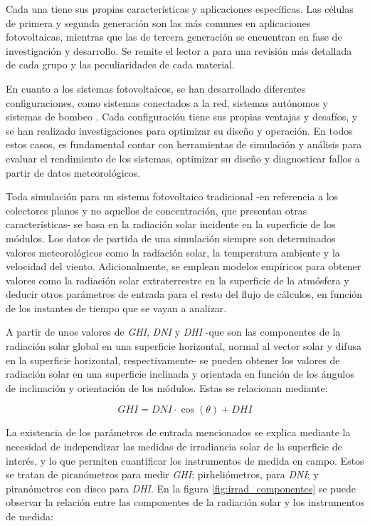 Cada una tiene sus propias características y aplicaciones específicas. Las células de primera y segunda generación son las más comunes en aplicaciones fotovoltaicas, mientras que las de tercera generación se encuentran en fase de investigación y desarrollo. Se remite el lector a \cite{Shubbak_2019} para una revisión más detallada de cada grupo y las peculiaridades de cada material.

En cuanto a los sistemas fotovoltaicos, se han desarrollado diferentes configuraciones, como sistemas conectados a la red, sistemas autónomos y sistemas de bombeo \cite{Perpinan2020}. Cada configuración tiene sus propias ventajas y desafíos, y se han realizado investigaciones para optimizar su diseño y operación. En todos estos casos, es fundamental contar con herramientas de simulación y análisis para evaluar el rendimiento de los sistemas, optimizar su diseño y diagnosticar fallos a partir de datos meteorológicos.

Toda simulación para un sistema fotovoltaico tradicional -en referencia a los colectores planos y no aquellos de concentración, que presentan otras características- se basa en la radiación solar incidente en la superficie de los módulos. Los datos de partida de una simulación siempre son determinados valores meteorológicos como la radiación solar, la temperatura ambiente y la velocidad del viento. Adicionalmente, se emplean modelos empíricos para obtener valores como la radiación solar extraterrestre en la superficie de la atmósfera y deducir otros parámetros de entrada para el resto del flujo de cálculos, en función de los instantes de tiempo que se vayan a analizar.

A partir de unos valores de \textit{GHI}, \textit{DNI} y \textit{DHI} -que son las componentes de la radiación solar global en una superficie horizontal, normal al vector solar y difusa en la superficie horizontal, respectivamente- se pueden obtener los valores de radiación solar en una superficie inclinada y orientada en función de los ángulos de inclinación y orientación de los módulos. Estas se relacionan mediante:

\begin{equation}
      GHI = DNI \cdot \cos(\theta) + DHI
\end{equation}

La existencia de los parámetros de entrada mencionados se explica mediante la necesidad de independizar las medidas de irradiancia solar de la superficie de interés, y lo que permiten cuantificar los instrumentos de medida en campo. Estos se tratan de piranómetros para medir \textit{GHI}; pirheliómetros, para \textit{DNI}; y piranómetros con disco para \textit{DHI}. En la figura \ref{fig:irrad_componentes} se puede observar la relación entre las componentes de la radiación solar y los instrumentos de medida:

